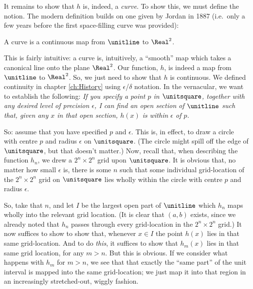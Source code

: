 \documentclass[../../../include/open-logic-section]{subfiles}
\begin{document}
It remains to show that $h$ is, indeed, a \emph{curve}. To show this, we must define the notion. The modern definition builds on one given by Jordan in 1887 (i.e.\ only a few years before the first space-filling curve was provided): 
\begin{defn}
	A curve is a continuous map from $\unitline$ to $\Real^2$. 
\end{defn}\noindent
This is fairly intuitive: a curve is, intuitively, a ``smooth'' map which takes a canonical line onto the plane $\Real^2$. Our function, $h$, is indeed a map from $\unitline$ to $\Real^2$. So, we just need to show that $h$ is continuous. We defined continuity in chapter \ref{ch:History} using $\epsilon$/$\delta$ notation. In the vernacular, we want to establish the following:
	\emph{If you specify a point $p$ in $\unitsquare$, together with any desired level of precision $\epsilon$, I can find an open section of $\unitline$ such that, given any $x$ in that open section, $h(x)$ is within $\epsilon$ of $p$. }

So: assume that you have specified $p$ and $\epsilon$. This is, in effect, to draw a circle with centre $p$ and radius $\epsilon$ on $\unitsquare$. (The circle might spill off the edge of $\unitsquare$, but that doesn't matter.) Now, recall that, when describing the function $h_n$, we drew a $2^n \times 2^n$ grid upon $\unitsquare$. It is obvious that, no matter how small $\epsilon$ is, there is some $n$ such that some individual grid-location of the $2^n \times 2^n$ grid on $\unitsquare$ lies wholly within the circle with centre $p$ and radius $\epsilon$. 

So, take that $n$, and let $I$ be the largest open part of $\unitline$ which $h_n$ maps wholly into the relevant grid location. (It is clear that $(a,b)$ exists, since we already noted that $h_n$ passes through every grid-location in the $2^n\times 2^n$ grid.) It now suffices to show to show that, whenever $x \in I$ the point $h(x)$ lies in that same grid-location. And to do \emph{this}, it suffices to show that $h_m(x)$ lies in that same grid location, for any $m > n$. But this is obvious. If we consider what happens with $h_m$ for $m > n$, we see that that exactly the ``same part'' of the unit interval is mapped into the same grid-location; we just map it into that region in an increasingly stretched-out, wiggly fashion. 
\end{document}

